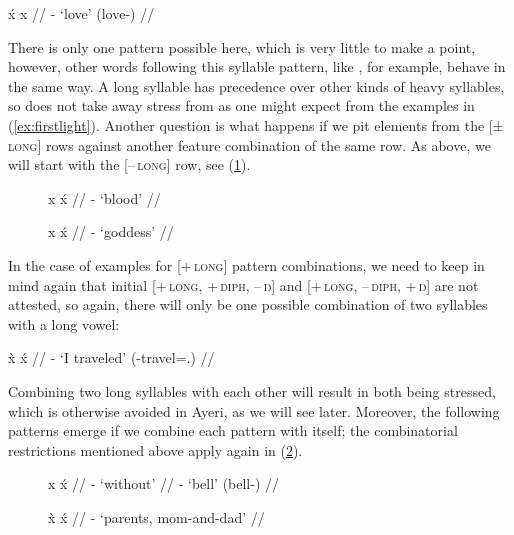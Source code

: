 \ex[everygla=\upshape]
\begingl
	\gla x́		{}	x		{} //
	\glb {}	-		{`love' (love-\Aarg{})} //
\endgl
\xe

There is only one pattern possible here, which is very little to make a point,
however, other words following this syllable pattern, like
, for example, behave in the same way. A long
syllable has precedence over other kinds of heavy syllables, so
 does not take away stress from  as one
might expect from the examples in (\ref{ex:firstlight}). Another question is
what happens if we pit elements from the \textsc{[±\,long]} rows against
another feature combination of the same row. As above, we will start with the
\textsc{[–\,long]} row, see (\ref{-l-l}).

\begin{figure}[h]
\pex[everygla=\upshape]\label{-l-l}
\a\begingl
	\gla x		{}	x́		{} //
	\glb {}	-		{`blood'} //
\endgl

\a\begingl
	\gla x		{}	x́		{} //
	\glb {}	-		{`goddess'} //
\endgl
\xe
\end{figure}

In the case of examples for \textsc{[+\,long]} pattern combinations, we need to
keep in mind again that initial \textsc{[+\,long, +\,diph, –\,ŋ]} and
\textsc{[+\,long, –\,diph, +\,ŋ]} are not attested, so again, there will only
be one possible combination of two syllables with a long vowel:

\ex[everygla=\upshape]\label{+l+l}
\begingl
	\gla x̀		{}	x́		{} //
	\glb {}	-		{`I traveled' 
		(\Pst{}-travel=\Fsg.\Top{})} //
\endgl
\xe

Combining two long syllables with each other will result in both being
stressed, which is otherwise avoided in Ayeri, as we will see later. Moreover,
the following patterns emerge if we combine each pattern with itself; the
combinatorial restrictions mentioned above apply again in (\ref{ex:+h+h}).

\begin{figure}[h]
\pex[everygla=\upshape]\label{ex:+h+h}
\a\begingl
	\gla x		{}	x́	{} //
	\glb {}	-		{`without'} //
	\glb {}	-		{`bell' (bell-\AargI{})} //
\endgl

\a\begingl
	\gla x̀		{}	x́	{} //
	\glb {}	-			{`parents, mom-and-dad'} //
\endgl
\xe
\end{figure}

